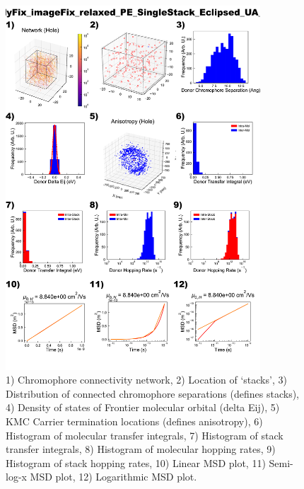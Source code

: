 \documentclass[12pt]{article}
\begin{document}
\begin{figure}[h]\centering
	\includegraphics[width=0.85\textwidth]{Figures/PE_SingleStack_Eclipsed.png}
    \caption{   1) Chromophore connectivity network, 
                2) Location of `stacks', 
                3) Distribution of connected chromophore separations (defines stacks),
                4) Density of states of Frontier molecular orbital (delta Eij),
                5) KMC Carrier termination locations (defines anisotropy),
                6) Histogram of molecular transfer integrals,
                7) Histogram of stack transfer integrals,
                8) Histogram of molecular hopping rates,
                9) Histogram of stack hopping rates,
                10) Linear MSD plot,
                11) Semi-log-x MSD plot,
                12) Logarithmic MSD plot.}
	\label{fig:PESingEcl}
\end{figure}
\end{document}
